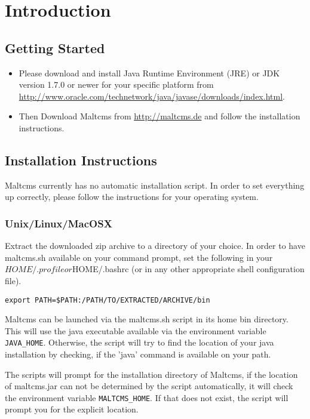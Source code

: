 \chapter{Introduction}
\section{Getting Started}
\begin{itemize}

    \item Please download and install Java Runtime Environment (JRE) or 
          JDK version 1.7.0 or newer for your specific platform from \url{http://www.oracle.com/technetwork/java/javase/downloads/index.html}.

    \item Then Download Maltcms from \url{http://maltcms.de} and follow the installation instructions.
\end{itemize}

\section{Installation Instructions}
Maltcms currently has no automatic installation script. In order to 
set everything up correctly, please follow the instructions for your
operating system.

\subsection{Unix/Linux/MacOSX}
Extract the downloaded zip archive to a directory of your choice. In
order to have maltcms.sh available on your command prompt, set the
following in your $HOME/.profile or $HOME/.bashrc 
(or in any other appropriate shell configuration file).

\begin{lstlisting}[style=script]
export PATH=$PATH:/PATH/TO/EXTRACTED/ARCHIVE/bin
\end{lstlisting}

Maltcms can be launched via the maltcms.sh script in its home bin
directory. This will use the java executable available via the 
environment variable \verb|JAVA_HOME|. Otherwise, the script will try to find
the location of your java installation by checking, if the 'java' 
command is available on your path.

The scripts will prompt for the installation directory of 
Maltcms, if the location of maltcms.jar can not be determined by the
script automatically, it will check the environment variable 
\verb|MALTCMS_HOME|. If that does not exist, the script will prompt you for 
the explicit location. 

